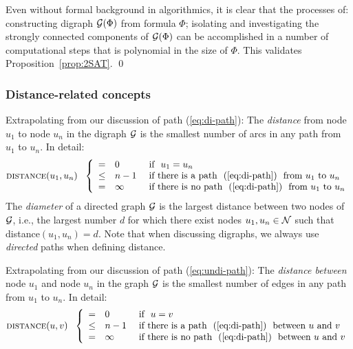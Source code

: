 \medskip

Even without formal background in algorithmics, it is clear that the
processes of: constructing digraph $\mbox{$\cal G$}(\Phi)$ from formula $\Phi$;
isolating and investigating the strongly connected components of
$\mbox{$\cal G$}(\Phi)$ can be accomplished in a number of computational steps that
is polynomial in the size of $\Phi$.  This validates
Proposition~\ref{prop:2SAT}.  \qed



\subsubsection{Distance-related concepts}

Extrapolating from our discussion of path (\ref{eq:di-path}): The {\it
  distance} from node $u_1$ to node $u_n$ in the digraph $\mbox{$\cal G$}$ is the
smallest number of arcs in any path from $u_1$ to $u_n$.  In detail:
\begin{equation}
\label{eq:di-distance-defn}
 \mbox{\sc distance}(u_1, u_n) \ \ \left\{
\begin{array}{cll}
= & 0 & \mbox{  if  } \ u_1 = u_n \\
\leq & n-1 & \mbox{  if there is a path } \ (\ref{eq:di-path})
\ \mbox{ from $u_1$ to $u_n$} \\
= & \infty & \mbox{  if there is no path } \ (\ref{eq:di-path})
\ \mbox{ from $u_1$ to $u_n$}
\end{array}
\right.
\end{equation}
The {\it diameter} 
 of a directed graph $\mbox{$\cal G$}$ is the largest
distance between two nodes of $\mbox{$\cal G$}$, i.e., the largest number $d$ for
which there exist nodes $u_1, u_n \in \mbox{$\cal N$}$ such that {\sc
  distance}$(u_1, u_n) = d$.  Note that when discussing digraphs, we
always use {\em directed} paths when defining distance.
\medskip

Extrapolating from our discussion of path (\ref{eq:undi-path}): The
{\it distance between} node $u_1$ and node $u_n$ in the graph $\mbox{$\cal G$}$ is
the smallest number of edges in any path from $u_1$ to $u_n$.  In
detail:
\begin{equation}
\label{eq:distance-defn}
 \mbox{\sc distance}(u, v) \ \ \left\{
\begin{array}{cll}
= & 0 & \mbox{  if  } \ u = v \\
\leq & n-1 & \mbox{  if there is a path } \ (\ref{eq:di-path})
\ \mbox{ between $u$ and $v$} \\
= & \infty & \mbox{  if there is no path } \ (\ref{eq:di-path})
\ \mbox{ between $u$ and $v$}
\end{array}
\right.
\end{equation}

